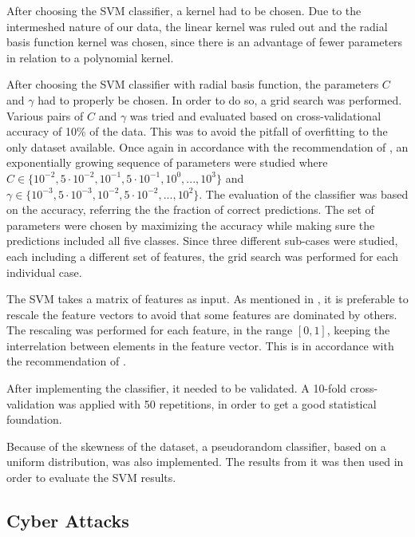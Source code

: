 After choosing the SVM classifier, a kernel had to be chosen. Due to the intermeshed nature of our data, the linear kernel was ruled out and the radial basis function kernel was chosen, since there is an advantage of fewer parameters in relation to a polynomial kernel.

After choosing the SVM classifier with radial basis function, the parameters $C$ and $\gamma$ had to properly be chosen. In order to do so, a grid search was performed. Various pairs of $C$ and $\gamma$ was tried and evaluated based on cross-validational accuracy of 10\% of the data. This was to avoid the pitfall of overfitting to the only dataset available. Once again in accordance with the recommendation of \citet{Hsu10apractical}, an exponentially growing sequence of parameters were studied where $C\in\{10^{-2},5\cdot10^{-2},10^{-1},5\cdot10^{-1},10^{0},...,10^{3}\}$ and $\gamma\in\{10^{-3},5\cdot10^{-3},10^{-2},5\cdot10^{-2},...,10^{2}\}$. The evaluation of the classifier was based on the accuracy, referring the the fraction of correct predictions. The set of parameters were chosen by maximizing the accuracy while making sure the predictions included all five classes. Since three different sub-cases were studied, each including a different set of features, the grid search was performed for each individual case. 

The SVM takes a matrix of features as input. As mentioned in , it is preferable to rescale the feature vectors to avoid that some features are dominated by others. The rescaling was performed for each feature, in the range $[0,1]$, keeping the interrelation between elements in the feature vector. This is in accordance with the recommendation of \citet{Hsu10apractical}.

After implementing the classifier, it needed to be validated. A 10-fold cross-validation was applied with 50 repetitions, in order to get a good statistical foundation.

Because of the skewness of the dataset, a pseudorandom classifier, based on a uniform distribution, was also implemented.  The results from it was then used in order to evaluate the SVM results. 

\subsection{Cyber Attacks}\label{cyberattacks}



\newpage 
